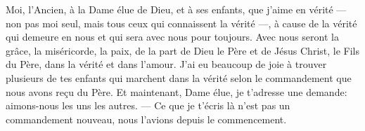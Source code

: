 Moi, l’Ancien, à la Dame élue de Dieu, et à ses enfants, que j’aime en vérité
	--- non pas moi seul, mais tous ceux qui connaissent la vérité ---,
	à cause de la vérité qui demeure en nous
	et qui sera avec nous pour toujours.
Avec nous seront la grâce, la miséricorde, la paix,
	de la part de Dieu le Père et de Jésus Christ, le Fils du Père,
	dans la vérité et dans l’amour.
J’ai eu beaucoup de joie
		à trouver plusieurs de tes enfants qui marchent dans la vérité
	selon le commandement que nous avons reçu du Père.
Et maintenant, Dame élue, je t’adresse une demande:
	aimons-nous les uns les autres.
--- Ce que je t’écris là n’est pas un commandement nouveau,
	nous l’avions depuis le commencement.
